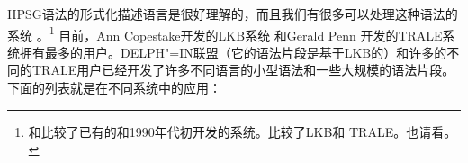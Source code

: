 HPSG语法的形式化描述语言是很好理解的，而且我们有很多可以处理这种语法的系统
\citep*{DS91a,%
DD93a-u,%
PV91a-u,%
DISCO94,%
%
Erbach95a,%
Schuetz96,STRD96a-u,%
SRTD96a,%
UBCCDDEEMMO-96a,Babel,Mueller2004b,%
CP96,PC99,%
GMG97a-u,%
Copestake2002a,%
Callmeier00a-u,%
Dahlloef2003a-u,%
MPR2002a-u,Penn2004a-u,%
Mueller2007b,%
Sato2008a-u,%
Kaufmann2009a-u%
}。\footnote{
\citet{UBCCDDEEMMO-96a}和\citet{Bolc:Czuba:ea:96a-u}比较了已有的和1990年代初开发的系统。\citet{MelnikHandWritten}比较了LKB和 TRALE。也请看。
}
目前，Ann Copestake开发的LKB系统 和Gerald Penn \citep*{MPR2002a-u,Penn2004a-u}开发的TRALE系统拥有最多的用户。DELPH"=IN联盟（它的语法片段是基于LKB的）和许多的不同的TRALE用户已经开发了许多不同语言的小型语法和一些大规模的语法片段。下面的列表就是在不同系统中的应用：
